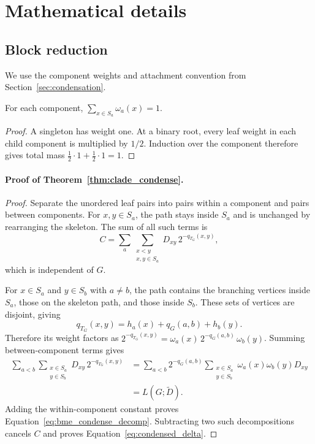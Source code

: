 \section{Mathematical details}
\subsection{Block reduction}
\label{sec:block_proof}

We use the component weights and attachment convention from
Section~\ref{sec:condensation}.

\begin{lemma}
\label{lem:normalization}
For each component, $\sum_{x\in S_a}\omega_a(x)=1$.
\end{lemma}
\begin{proof}
A singleton has weight one.
At a binary root, every leaf weight in each child component is multiplied by $1/2$.
Induction over the component therefore gives total mass
$\tfrac12\cdot1+\tfrac12\cdot1=1$.
\end{proof}

\paragraph{Proof of Theorem~\ref{thm:clade_condense}.}

\begin{proof}
Separate the unordered leaf pairs into pairs within a component and pairs between components.
For $x,y\in S_a$, the path stays inside $S_a$ and is unchanged by rearranging the skeleton.
The sum of all such terms is
\[
 C=\sum_a\sum_{\substack{x<y\\x,y\in S_a}}
      D_{xy}\,2^{-q_{T_G}(x,y)},
\]
which is independent of $G$.

For $x\in S_a$ and $y\in S_b$ with $a\ne b$, the path contains the branching vertices inside $S_a$, those on the skeleton path, and those inside $S_b$.
These sets of vertices are disjoint, giving
\[
 q_{T_G}(x,y)=h_a(x)+q_G(a,b)+h_b(y).
\]
Therefore its weight factors as
$2^{-q_{T_G}(x,y)}=\omega_a(x)\,2^{-q_G(a,b)}\,\omega_b(y)$.
Summing between-component terms gives
\begin{align*}
 \sum_{a<b}\sum_{\substack{x\in S_a\\y\in S_b}}
 D_{xy}\,2^{-q_{T_G}(x,y)}
 &=\sum_{a<b}2^{-q_G(a,b)}
      \sum_{\substack{x\in S_a\\y\in S_b}}\omega_a(x)\omega_b(y)D_{xy}\\
 &=L(G;\widetilde D).
\end{align*}
Adding the within-component constant proves Equation~\eqref{eq:bme_condense_decomp}.
Subtracting two such decompositions cancels $C$ and proves Equation~\eqref{eq:condensed_delta}.
\end{proof}

